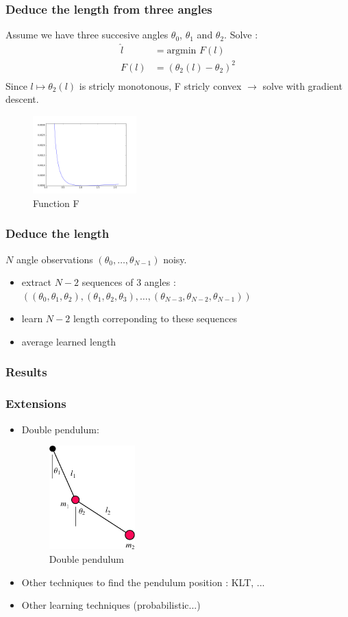\documentclass{beamer}
\begin{document}
\begin{frame}
\frametitle{Deduce the length from three angles}
Assume we have three succesive angles $\theta_0$, $\theta_1$ and $\theta_2$.
Solve :
\begin{align*}
  \hat{l} &= \text{argmin } F(l)\\
  F(l) &= \left( \theta_2(l) - \theta_2 \right)^2\\
\end{align*}
Since $l \mapsto \theta_2(l)$ is stricly monotonous, F stricly convex $\rightarrow$ solve with gradient descent.
\begin{figure}
  \captionsetup{labelformat=empty}
  \includegraphics[height=3cm]{F.png}
  \caption{Function F}
\end{figure}
\end{frame}

\begin{frame}
\frametitle{Deduce the length}
$N$ angle observations $(\theta_0, \ldots, \theta_{N-1})$ noisy.
\begin{itemize}
  \item extract $N-2$ sequences of 3 angles :
    $\left( (\theta_0, \theta_1, \theta_2), (\theta_1, \theta_2, \theta_3), \ldots , (\theta_{N-3}, \theta_{N-2}, \theta_{N-1}) \right)$
  \item learn $N-2$ length correponding to these sequences
  \item average learned length
\end{itemize}
\end{frame}

\begin{frame}
\frametitle{Results}
\end{frame}


\begin{frame}
\frametitle{Extensions}
\begin{itemize}
  \item Double pendulum:
    \begin{figure}
      \captionsetup{labelformat=empty}
      \includegraphics[height=4cm]{pendule_double.png}
      \caption{Double pendulum}
    \end{figure}
  \item Other techniques to find the pendulum position : KLT, ...
  \item Other learning techniques (probabilistic...)
\end{itemize}
\end{frame}
\end{document}
